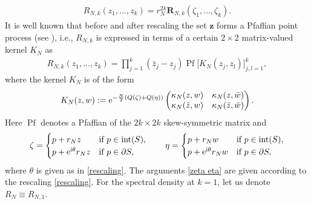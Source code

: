 \documentclass[pdftex]{sigma}
\numberwithin{equation}{section}
\newcommand{\bfR}{\mathbf{R}}
\newcommand{\1}{\chi}
\newcommand{\Pf}{{\operatorname{Pf}}}
\begin{document}
\begin{gather*}
R_{N,k}(z_1,\dots, z_k)=r_N^{2k} \bfR_{N,k}(\zeta_1,\dots,\zeta_k).
\end{gather*}
It is well known that before and after rescaling the
set $\boldsymbol{z}$ forms a Pfaffian point process (see \cite{MR1928853,Mehta}), i.e., $R_{N,k}$ is expressed in terms of a certain $2\times 2$ matrix-valued kernel $K_N$ as
\begin{gather} \label{RNk Pf}
	R_{N,k}(z_1,\dots, z_k)=\prod_{j=1}^{k}
(\bar{z}_j-z_j) \Pf \big[ K_{N}(z_j,z_l) \big]_{ j,l=1 }^k ,
\end{gather}
where the kernel $K_N$ is of the form
\begin{gather*}
	K_N(z,w):={\rm e}^{ -\frac{N}{2} (Q( \zeta )+Q( \eta )) } \begin{pmatrix}
		\kappa_N(z,w) & \kappa_N(z,\bar{w}) \\
		\kappa_N(\bar{z},w) & \kappa_N(\bar{z},\bar{w})
	\end{pmatrix}.
\end{gather*}
Here $\Pf$ denotes a Pfaffian of the $2k \times 2k$ skew-symmetric matrix and
\begin{gather} \label{zeta eta}
\zeta=\begin{cases}
	p+r_N z &\text{if }p \in \textup{int}(S),
	\\
	p+{\rm e}^{{\rm i}\theta} r_N z &\text{if }p \in \partial S,
\end{cases} \qquad
 \eta=\begin{cases}
	 p+r_N w &\text{if }p \in \textup{int}(S),
	\\
	 p+{\rm e}^{{\rm i}\theta} r_N w &\text{if }p \in \partial S,
\end{cases}
\end{gather}
where $\theta$ is given as in \eqref{rescaling}.
The arguments \eqref{zeta eta} are given according to the rescaling \eqref{rescaling}.
For the spectral density at $k=1$, let us denote $R_N \equiv R_{N,1}$.
\end{document}
